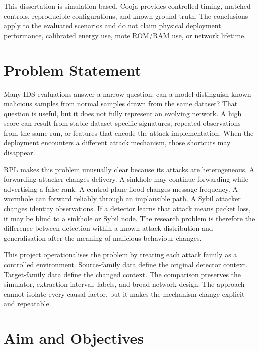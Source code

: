 This dissertation is simulation-based. Cooja provides controlled timing, matched controls, reproducible configurations, and known ground truth. The conclusions apply to the evaluated scenarios and do not claim physical deployment performance, calibrated energy use, mote ROM/RAM use, or network lifetime.

\section{Problem Statement}

Many IDS evaluations answer a narrow question: can a model distinguish known malicious samples from normal samples drawn from the same dataset? That question is useful, but it does not fully represent an evolving network. A high score can result from stable dataset-specific signatures, repeated observations from the same run, or features that encode the attack implementation. When the deployment encounters a different attack mechanism, those shortcuts may disappear.

RPL makes this problem unusually clear because its attacks are heterogeneous. A forwarding attacker changes delivery. A sinkhole may continue forwarding while advertising a false rank. A control-plane flood changes message frequency. A wormhole can forward reliably through an implausible path. A Sybil attacker changes identity observations. If a detector learns that attack means packet loss, it may be blind to a sinkhole or Sybil node. The research problem is therefore the difference between detection within a known attack distribution and generalisation after the meaning of malicious behaviour changes.

This project operationalises the problem by treating each attack family as a controlled environment. Source-family data define the original detector context. Target-family data define the changed context. The comparison preserves the simulator, extraction interval, labels, and broad network design. The approach cannot isolate every causal factor, but it makes the mechanism change explicit and repeatable.

\section{Aim and Objectives}

